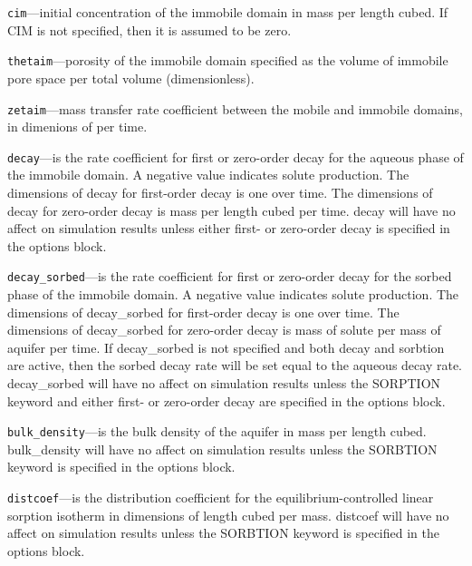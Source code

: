 \begin{description}
\item \texttt{cim}---initial concentration of the immobile domain in mass per length cubed.  If CIM is not specified, then it is assumed to be zero.

\item \texttt{thetaim}---porosity of the immobile domain specified as the volume of immobile pore space per total volume (dimensionless).

\item \texttt{zetaim}---mass transfer rate coefficient between the mobile and immobile domains, in dimenions of per time.

\item \texttt{decay}---is the rate coefficient for first or zero-order decay for the aqueous phase of the immobile domain.  A negative value indicates solute production.  The dimensions of decay for first-order decay is one over time.  The dimensions of decay for zero-order decay is mass per length cubed per time.  decay will have no affect on simulation results unless either first- or zero-order decay is specified in the options block.

\item \texttt{decay\_sorbed}---is the rate coefficient for first or zero-order decay for the sorbed phase of the immobile domain.  A negative value indicates solute production.  The dimensions of decay\_sorbed for first-order decay is one over time.  The dimensions of decay\_sorbed for zero-order decay is mass of solute per mass of aquifer per time.  If decay\_sorbed is not specified and both decay and sorbtion are active, then the sorbed decay rate will be set equal to the aqueous decay rate.  decay\_sorbed will have no affect on simulation results unless the SORPTION keyword and either first- or zero-order decay are specified in the options block.

\item \texttt{bulk\_density}---is the bulk density of the aquifer in mass per length cubed.  bulk\_density will have no affect on simulation results unless the SORBTION keyword is specified in the options block.

\item \texttt{distcoef}---is the distribution coefficient for the equilibrium-controlled linear sorption isotherm in dimensions of length cubed per mass.  distcoef will have no affect on simulation results unless the SORBTION keyword is specified in the options block.

\end{description}

